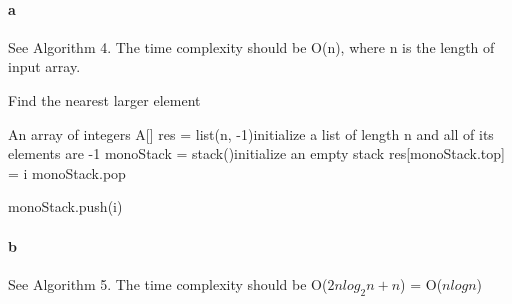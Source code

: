 \documentclass[paper=a4, fontsize=11pt]{scrartcl} %
\numberwithin{equation}{section} %
\numberwithin{figure}{section} %
\numberwithin{table}{section} %
\begin{document}
\paragraph{a} See Algorithm 4. The time complexity should be O(n), where n is the length of input array.


\begin{algorithm}
	\caption{Find the nearest larger element}
	\begin{algorithmic}[1]
		\Require An array of integers A[]
            \State res = list(n, -1)\Comment initialize a list of length n and all of its elements are -1
            \State monoStack = stack()\Comment initialize an empty stack
            \State res[monoStack.top] = i
            \State monoStack.pop

            \EndWhile
            \State monoStack.push(i)

            \EndFor
            \State {}


            
			
		\EndFunction
	\end{algorithmic}

\end{algorithm}

\paragraph{b}
See Algorithm 5. The time complexity should be O($2nlog_2n+n$) = O($nlogn$)
\end{document}
